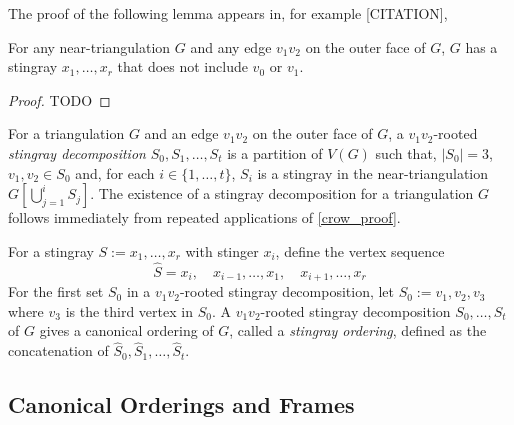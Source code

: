 \documentclass{patmorin}
\newcommand{\defin}[1]{\emph{\color{brightmaroon}#1}}
\begin{document}
The proof of the following lemma appears in, for example [CITATION],

\begin{lem}\label{crow_proof}
  For any near-triangulation $G$ and any edge $v_1v_2$ on the outer face of $G$, $G$ has a stingray $x_1,\ldots,x_r$ that does not include $v_0$ or $v_1$.
\end{lem}

\begin{proof}
  TODO
\end{proof}

For a triangulation $G$ and an edge $v_1v_2$ on the outer face of $G$, a $v_1v_2$-rooted \defin{stingray decomposition} $S_0,S_1,\ldots,S_t$ is a partition of $V(G)$ such that, $|S_0|=3$, $v_1,v_2\in S_0$ and, for each $i\in\{1,\ldots,t\}$, $S_i$ is a stingray in the near-triangulation $G[\bigcup_{j=1}^{i} S_j]$.  The existence of a stingray decomposition for a triangulation $G$ follows immediately from repeated applications of \cref{crow_proof}.

For a stingray $S:=x_1,\ldots,x_r$ with stinger $x_i$, define the vertex sequence
\[
   \widehat{S} =
   x_i,\quad
   x_{i-1},\ldots,x_{1},\quad
   x_{i+1},\ldots,x_r
\]
For the first set $S_0$ in a $v_1v_2$-rooted stingray decomposition, let $\widehat{S}_0:=v_1,v_2,v_3$ where $v_3$ is the third vertex in $S_0$.
A $v_1v_2$-rooted stingray decomposition $S_0,\ldots,S_t$ of $G$ gives a canonical ordering of $G$, called a \defin{stingray ordering}, defined as the concatenation of $\widehat{S}_0,\widehat{S}_1,\ldots,\widehat{S}_t$.
%

\subsection{Canonical Orderings and Frames}
\end{document}
